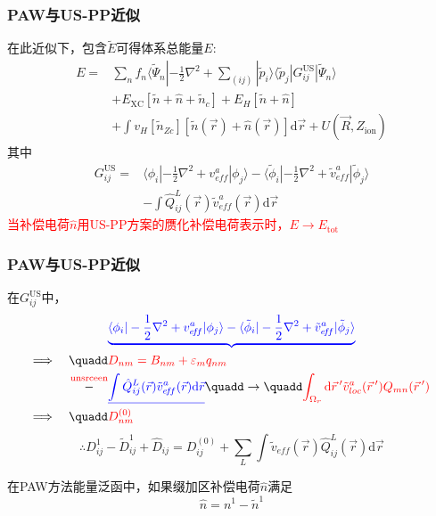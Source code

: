 \documentclass[cjk,slidestop,compress,mathserif,blue]{beamer}
\begin{document}
\frame
{
	\frametitle{\textrm{PAW}与\textrm{US-PP}近似}
	在此近似下，包含$\tilde E$可得体系总能量$E$:
	\begin{displaymath}
		\begin{aligned}
			E=&\sum_nf_n\langle\tilde\Psi_n|-\frac12\nabla^2+\sum_{(ij)}|\tilde p_i\rangle\langle\tilde p_j|G_{ij}^{\mathrm{US}}|\tilde\Psi_n\rangle\\
			&+E_{\mathrm{XC}}[\tilde n+\hat n+\tilde n_c]+E_H[\tilde n+\hat n]\\
			&+\int v_H[\tilde n_{Zc}][\tilde n(\vec r)+\hat n(\vec r)]\mathrm{d}\vec r+U(\vec R,Z_{\mathrm{ion}})
		\end{aligned}
	\end{displaymath}
	其中
	\begin{displaymath}
		\begin{aligned}
			G_{ij}^{\mathrm{US}}=&\langle\phi_i|-\frac12\nabla^2+v_{e\!f\!f}^a|\phi_j\rangle-\langle\tilde\phi_i|-\frac12\nabla^2+\tilde v_{e\!f\!f}^a|\tilde\phi_j\rangle\\
			&-\int\hat Q_{ij}^L(\vec r)\tilde v_{e\!f\!f}^a(\vec r)\mathrm{d}\vec r
		\end{aligned}
	\end{displaymath}
	\textcolor{red}{当补偿电荷$\hat n$用\textrm{US-PP}方案的赝化补偿电荷表示时，$E\rightarrow E_{\mathrm{tot}}$}
}

\frame
{
	\frametitle{\textrm{PAW}与\textrm{US-PP}近似}
	在$G_{ij}^{\mathrm{US}}$中，
	\begin{displaymath}
		\begin{aligned}
			&\textcolor{blue}{\underbrace{\langle\phi_i|-\frac12\nabla^2+v_{e\!f\!f}^a|\phi_j\rangle-\langle\tilde\phi_i|-\frac12\nabla^2+\tilde v_{e\!f\!f}^a|\tilde\phi_j\rangle}}\\
			\Longrightarrow\quad\quadd&\textcolor{red}{D_{nm}=B_{nm}+\varepsilon_mq_{nm}} \\
			\overset{\text{\textcolor{red}{\textrm{unsrceen}}}}{-}&\textcolor{blue}{\underline{\int\hat Q_{ij}^L(\vec r)\tilde v_{e\!f\!f}^a(\vec r)\mathrm{d}\vec r}} \quadd\rightarrow\quadd \textcolor{red}{\int_{\Omega_r}\mathrm{d}\vec r\,^{\prime}\tilde v_{loc}^a(\vec r\,^{\prime})Q_{mn}(\vec r\,^{\prime})}\\
			\Longrightarrow\quad\quadd&\textcolor{red}{D_{nm}^{(0)}}
		\end{aligned}
	\end{displaymath}
	\begin{displaymath}
		\therefore D_{ij}^1-\tilde D_{ij}^1+\hat D_{ij}=D_{ij}^{(0)}+\sum_L\int\tilde v_{e\!f\!f}(\vec r)\hat{Q}_{ij}^L(\vec r)\mathrm{d}\vec r
	\end{displaymath}

	在\textrm{PAW}方法能量泛函中，如果缀加区补偿电荷$\hat n$满足$$\hat n=n^1-\tilde n^1$$
}
\end{document}
